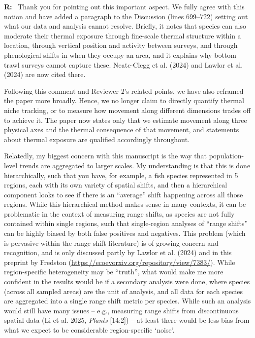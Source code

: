 \documentclass[11pt]{article}
\newcommand{\reviewer}[1]{\par\medskip\noindent\textcolor{revcolor}{#1}\par}
\newenvironment{reply}
{\par\smallskip\begingroup\color{replycolor}\noindent\textbf{R:}\ }
{\endgroup\par\medskip}
\begin{document}
\begin{reply}
Thank you for pointing out this important aspect. We fully agree with this notion and have added a paragraph to the Discussion (lines 699--722) setting out what our data and analysis cannot resolve. Briefly, it notes that species can also moderate their thermal exposure through fine-scale thermal structure within a location, through vertical position and activity between surveys, and through phenological shifts in when they occupy an area, and it explains why bottom-trawl surveys cannot capture these. Neate-Clegg et al. (2024) and Lawlor et al. (2024) are now cited there.

Following this comment and Reviewer 2's related points, we have also reframed the paper more broadly. Hence, we no longer claim to directly quantify thermal niche tracking, or to measure how movement along different dimensions trades off to achieve it. The paper now states only that we estimate movement along three physical axes and the thermal consequence of that movement, and statements about thermal exposure are qualified accordingly throughout.
\end{reply}

\reviewer{Relatedly, my biggest concern with this manuscript is the way that population-level trends are aggregated to larger scales. My understanding is that this is done hierarchically, such that you have, for example, a fish species represented in 5 regions, each with its own variety of spatial shifts, and then a hierarchical component looks to see if there is an ``average'' shift happening across all those regions. While this hierarchical method makes sense in many contexts, it can be problematic in the context of measuring range shifts, as species are not fully contained within single regions, such that single-region analyses of ``range shifts'' can be highly biased by both false positives and negatives. This problem (which is pervasive within the range shift literature) is of growing concern and recognition, and is only discussed partly by Lawlor et al. (2024) and in this preprint by Fredston (\url{https://ecoevorxiv.org/repository/view/7383/}). While region-specific heterogeneity may be ``truth'', what would make me more confident in the results would be if a secondary analysis were done, where species (across all sampled areas) are the unit of analysis, and all data for each species are aggregated into a single range shift metric per species. While such an analysis would still have many issues -- e.g., measuring range shifts from discontinuous spatial data (Li et
al. 2025, \textit{Plants} [14:2]) -- at least there would be less bias from what we expect to be considerable region-specific `noise'.}
\end{document}
